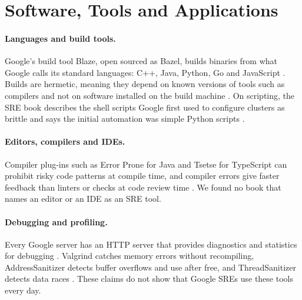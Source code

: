 \section{Software, Tools and Applications}

\paragraph{Languages and build tools.}
Google's build tool Blaze, open sourced as Bazel, builds binaries from what Google calls its standard languages: C++, Java, Python, Go and JavaScript \cite{sre-book}. Builds are hermetic, meaning they depend on known versions of tools such as compilers and not on software installed on the build machine \cite{sre-book}. On scripting, the SRE book describes the shell scripts Google first used to configure clusters as brittle and says the initial automation was simple Python scripts \cite{sre-book}.

\paragraph{Editors, compilers and IDEs.}
Compiler plug-ins such as Error Prone for Java and Tsetse for TypeScript can prohibit risky code patterns at compile time, and compiler errors give faster feedback than linters or checks at code review time \cite{bsrs}. We found no book that names an editor or an IDE as an SRE tool.

\paragraph{Debugging and profiling.}
Every Google server has an HTTP server that provides diagnostics and statistics for debugging \cite{sre-book}. Valgrind catches memory errors without recompiling, AddressSanitizer detects buffer overflows and use after free, and ThreadSanitizer detects data races \cite{bsrs}. These claims do not show that Google SREs use these tools every day.

